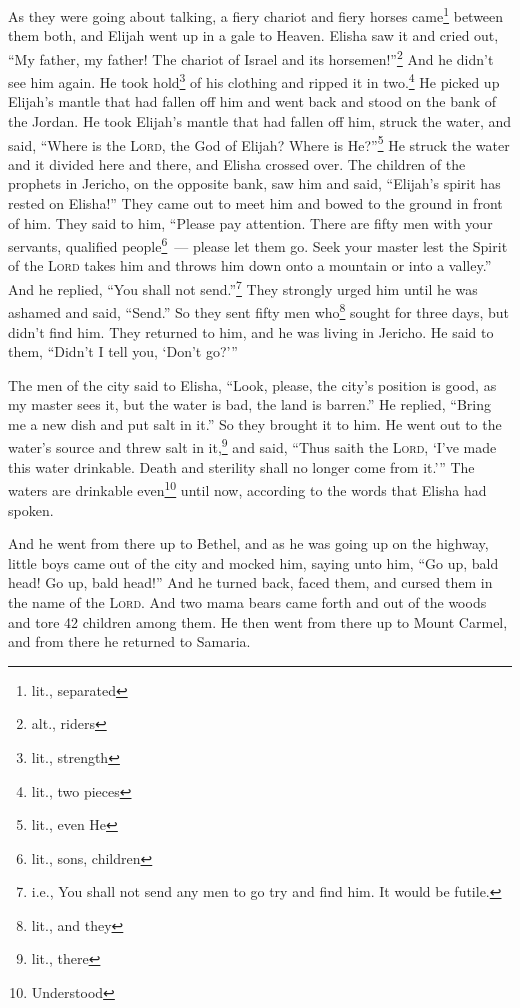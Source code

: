 \begin{inparaenum}
     As they were going about talking, a fiery chariot and fiery horses came\footnote{lit., separated} between them both, and Elijah went up in a gale to Heaven.%
     Elisha saw it and cried out, ``My father, my father! The chariot of Israel and its horsemen!''\footnote{alt., riders} And he didn't see him again. He took hold\footnote{lit., strength} of his clothing and ripped it in two.\footnote{lit., two pieces}%
     He picked up Elijah's mantle that had fallen off him and went back and stood on the bank of the Jordan.%
     He took Elijah's mantle that had fallen off him, struck the water, and said, ``Where is the \textsc{Lord}, the God of Elijah? Where is He?''\footnote{lit., even He} He struck the water and it divided here and there, and Elisha crossed over.%
     The children of the prophets in Jericho, on the opposite bank, saw him and said, ``Elijah's spirit has rested on Elisha!'' They came out to meet him and bowed to the ground in front of him.%
     They said to him, ``Please pay attention. There are fifty men with your servants, qualified people\footnote{lit., sons, children}~--- please let them go. Seek your master lest the Spirit of the \textsc{Lord} takes him and throws him down onto a mountain or into a valley.'' And he replied, ``You shall not send.''\footnote{i.e., You shall not send any men to go try and find him. It would be futile.}%
     They strongly urged him until he was ashamed and said, ``Send.'' So they sent fifty men who\footnote{lit., and they} sought for three days, but didn't find him.%
     They returned to him, and he was living in Jericho. He said to them, ``Didn't I tell you, `Don't go?'\thinspace''%
    
     The men of the city said to Elisha, ``Look, please, the city's position is good, as my master sees it, but the water is bad, the land is barren.''%
     He replied, ``Bring me a new dish and put salt in it.'' So they brought it to him.%
     He went out to the water's source and threw salt in it,\footnote{lit., there} and said, ``Thus saith the \textsc{Lord}, `I've made this water drinkable. Death and sterility shall no longer come from it.'\thinspace''%
     The waters are drinkable even\footnote{Understood} until now, according to the words that Elisha had spoken.%
    
     And he went from there up to Bethel, and as he was going up on the highway, little boys came out of the city and mocked him, saying unto him, ``Go up, bald head! Go up, bald head!''%
     And he turned back, faced them, and cursed them in the name of the \textsc{Lord}. And two mama bears came forth and out of the woods and tore 42 children among them.%
     He then went from there up to Mount Carmel, and from there he returned to Samaria.%
\end{inparaenum}
